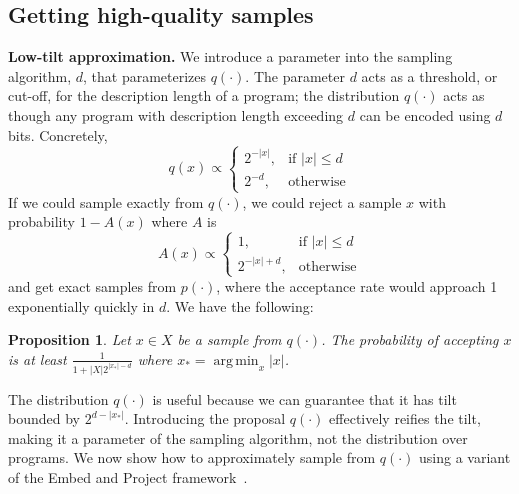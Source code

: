 \documentclass{article}
\DeclareMathOperator*{\argmin}{arg\,min} %
\DeclareMathOperator{\argmin}{argmin} %
\newtheorem{proposition}{Proposition}
\begin{document}
\subsection{Getting high-quality samples}
\textbf{Low-tilt approximation.}
We introduce a parameter into the sampling algorithm, $d$, that parameterizes $q(\cdot )$.
The parameter $d$ acts as a threshold, or cut-off, for the description length of a program;
the distribution $q(\cdot )$ acts as though any program with description length exceeding $d$ can be encoded using $d$ bits. Concretely,
\begin{equation}
  q(x) \propto \begin{cases}
    2^{-\lvert x \rvert },& \text{if } \lvert x \rvert \leq d\\
    2^{-d},              & \text{otherwise}
\end{cases}
  \end{equation}
If we could sample exactly from $q(\cdot )$, we could reject a sample $x$ with probability $1-A(x)$ where $A$ is
\begin{equation}
  A(x) \propto \begin{cases}
    1,& \text{if } \lvert x \rvert \leq d\\
    2^{-\lvert x \rvert +d},              & \text{otherwise}
    \end{cases}
  \end{equation}
and get exact samples from $p(\cdot )$, where the acceptance rate would approach 1 exponentially quickly in $d$. We have the following:
\begin{proposition}\label{acceptanceBound}
  Let $x\in X$ be a sample from $q(\cdot )$. The probability of accepting $x$ is at least $\frac{1}{1 + |X|2^{\lvert x_* \rvert -d}}$ where $x_* = \argmin_x \lvert x \rvert $.
\end{proposition}


The distribution $q(\cdot )$ is useful because we can guarantee that it has tilt bounded by
$2^{d - \lvert x_* \rvert }$.
Introducing the proposal $q(\cdot )$ effectively reifies the tilt,
making it a parameter of the sampling algorithm,
not the distribution over programs.
We now show how to approximately sample from $q(\cdot )$ using a variant of the Embed and Project framework~\cite{ermon2013embed}.
\end{document}
